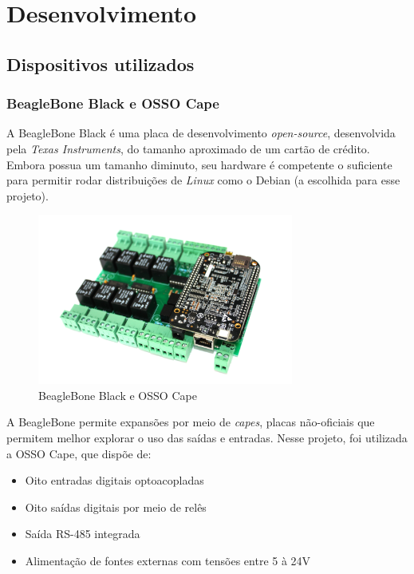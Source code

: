 \chapter{Desenvolvimento}

  \section{Dispositivos utilizados}

    \subsection{BeagleBone Black e OSSO Cape}

      A BeagleBone Black é uma placa de desenvolvimento \textit{open-source}, desenvolvida pela \textit{Texas Instruments}, do tamanho aproximado de um cartão de crédito. Embora possua um tamanho diminuto, seu hardware é competente o suficiente para permitir rodar distribuições de \textit{Linux} como o Debian (a escolhida para esse projeto).

      \begin{figure}[H]
        \begin{center}
          \includegraphics[width=0.75\textwidth,natwidth=585,natheight=180]{assets/images/devices-beaglebone.jpg}
          \caption{BeagleBone Black e OSSO Cape}
          \label{fig:bbb}
        \end{center}
      \end{figure}

      A BeagleBone permite expansões por meio de \textit{capes}, placas não-oficiais que permitem melhor explorar o uso das saídas e entradas. Nesse projeto, foi utilizada a OSSO Cape, que dispõe de:

      \begin{itemize}
        \item Oito entradas digitais optoacopladas
        \item Oito saídas digitais por meio de relês
        \item Saída RS-485 integrada
        \item Alimentação de fontes externas com tensões entre 5 à 24V
      \end{itemize}

